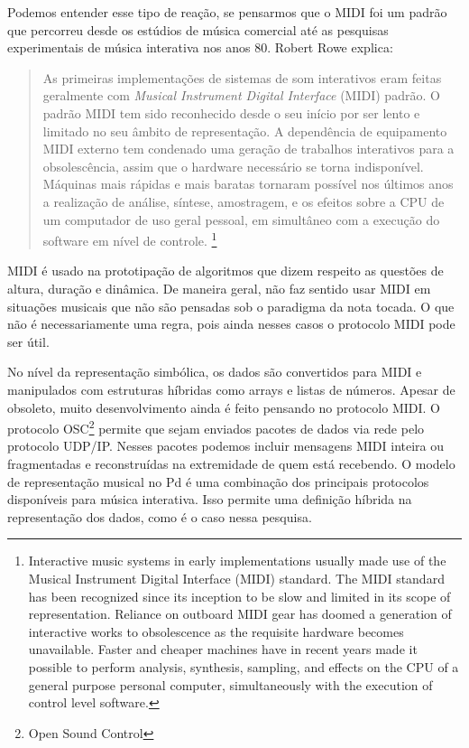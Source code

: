 \documentclass{ppgmus}
\begin{document}
Podemos entender esse tipo de reação, se pensarmos que o MIDI foi um padrão
que percorreu desde os estúdios de música comercial até as pesquisas experimentais
de música interativa nos anos 80. Robert Rowe explica:

\begin{quote}
As primeiras implementações de sistemas de som interativos eram feitas geralmente com \textit{Musical
Instrument Digital Interface} (MIDI) padrão. O padrão MIDI tem sido reconhecido desde o seu início
por ser lento e limitado no seu âmbito de representação. A dependência de equipamento MIDI externo tem
condenado uma geração de trabalhos interativos para a obsolescência, assim que o hardware necessário se torna indisponível.
Máquinas mais rápidas e mais baratas tornaram possível nos últimos anos a realização de análise, síntese, amostragem, 
e os efeitos sobre a CPU de um computador de uso geral pessoal, em simultâneo com a
execução do software em nível de controle. \cite{rowe05}
\footnote{
 Interactive music systems in early implementations usually made use of the Musical
Instrument Digital Interface (MIDI) standard. The MIDI standard has been recognized since its inception
to be slow and limited in its scope of representation. Reliance on outboard MIDI gear has
doomed a generation of interactive works to obsolescence as the requisite hardware becomes unavailable.
Faster and cheaper machines have in recent years made it possible to perform analysis, synthesis,
sampling, and effects on the CPU of a general purpose personal computer, simultaneously with the
execution of control level software.}
\end{quote}


MIDI é usado na prototipação de algoritmos que dizem respeito as questões de 
altura, duração e dinâmica. De maneira geral, não faz sentido usar MIDI em situações 
musicais que não são pensadas sob o paradigma da nota tocada. O que não é
necessariamente uma regra, pois ainda nesses casos o protocolo MIDI pode ser
útil.

No nível da representação simbólica, os dados são convertidos para MIDI e manipulados
com estruturas híbridas como arrays e listas de números. Apesar de obsoleto, muito desenvolvimento
ainda é feito pensando no protocolo MIDI. O protocolo OSC\footnote{Open Sound Control} permite que
sejam enviados pacotes de dados via rede pelo protocolo UDP/IP. Nesses pacotes podemos incluir
mensagens MIDI inteira ou fragmentadas e reconstruídas na extremidade de quem está recebendo.
O modelo de representação musical no Pd é uma combinação dos principais protocolos disponíveis para
música interativa. Isso permite uma definição híbrida na representação dos dados, como é o caso
nessa pesquisa.
\end{document}
